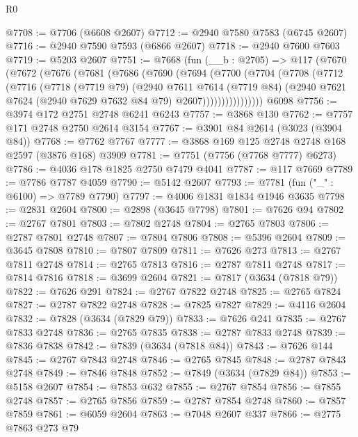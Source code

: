 \begin{lexlean}{R0}
\begin{coremodule}
@7708 := @7706 (@6608 @2607)
@7712 := @2940 @7580 @7583 (@6745 @2607)
@7716 := @2940 @7590 @7593 (@6866 @2607)
@7718 := @2940 @7600 @7603
@7719 := @5203 @2607
@7751 := @7668
    (fun (__b : @2705) =>
    @117
      (@7670
        (@7672
          (@7676
            (@7681
              (@7686
                (@7690
                  (@7694
                    (@7700
                      (@7704
                        (@7708
                          (@7712
                            (@7716
                              (@7718
                                (@7719 @79)
                                (@2940
                                  @7611
                                  @7614
                                  (@7719 @84)
                                  (@2940
                                    @7621
                                    @7624
                                    (@2940 @7629 @7632 @84 @79)
                                    @2607))))))))))))))))
    @6098
@7756 := @3974 @172 @2751 @2748 @6241 @6243
@7757 := @3868 @130
@7762 := @7757 @171 @2748 @2750 @2614 @3154
@7767 := @3901 @84 @2614 (@3023 (@3904 @84))
@7768 := @7762 @7767
@7777 := @3868 @169 @125 @2748 @2748 @168 @2597 (@3876 @168) @3909
@7781 := @7751 (@7756 (@7768 @7777) @6273)
@7786 := @4036 @178 @1825 @2750 @7479 @4041
@7787 := @117 @7669
@7789 := @7786 @7787 @4059
@7790 := @5142 @2607
@7793 := @7781 (fun ("_" : @6100) => @7789 @7790)
@7797 := @4006 @1831 @1834 @1946 @3635
@7798 := @2831 @2604
@7800 := @2898 (@3645 @7798)
@7801 := @7626 @94
@7802 := @2767 @7801
@7803 := @7802 @2748
@7804 := @2765 @7803
@7806 := @2787 @7801 @2748
@7807 := @7804 @7806
@7808 := @5396 @2604
@7809 := @3645 @7808
@7810 := @7807 @7809
@7811 := @7626 @273
@7813 := @2767 @7811 @2748
@7814 := @2765 @7813
@7816 := @2787 @7811 @2748
@7817 := @7814 @7816
@7818 := @3699 @2604
@7821 := @7817 (@3634 (@7818 @79))
@7822 := @7626 @291
@7824 := @2767 @7822 @2748
@7825 := @2765 @7824
@7827 := @2787 @7822 @2748
@7828 := @7825 @7827
@7829 := @4116 @2604
@7832 := @7828 (@3634 (@7829 @79))
@7833 := @7626 @241
@7835 := @2767 @7833 @2748
@7836 := @2765 @7835
@7838 := @2787 @7833 @2748
@7839 := @7836 @7838
@7842 := @7839 (@3634 (@7818 @84))
@7843 := @7626 @144
@7845 := @2767 @7843 @2748
@7846 := @2765 @7845
@7848 := @2787 @7843 @2748
@7849 := @7846 @7848
@7852 := @7849 (@3634 (@7829 @84))
@7853 := @5158 @2607
@7854 := @7853 @632
@7855 := @2767 @7854
@7856 := @7855 @2748
@7857 := @2765 @7856
@7859 := @2787 @7854 @2748
@7860 := @7857 @7859
@7861 := @6059 @2604
@7863 := @7048 @2607 @337
@7866 := @2775 @7863 @273 @79

\end{coremodule}
\end{lexlean}

